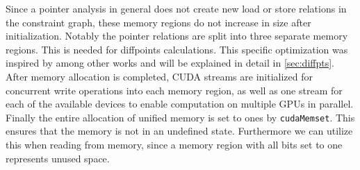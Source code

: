 Since a pointer analysis in general does not create new load or store relations in the constraint graph, these memory regions do not increase in size after initialization.
Notably the pointer relations are split into three separate memory regions. This is needed for diffpoints calculations. This specific optimization was inspired by \cite{mendez2010parallel} among other works and will be explained in detail in \autoref{sec:diffpts}.
After memory allocation is completed, CUDA streams are initialized for concurrent write operations into each memory region, as well as one stream for each of the available devices to enable computation on multiple GPUs in parallel.
Finally the entire allocation of unified memory is set to ones by \verb|cudaMemset|. This ensures that the memory is not in an undefined state. Furthermore we can utilize this when reading from memory, since a memory region with all bits set to one represents unused space.









